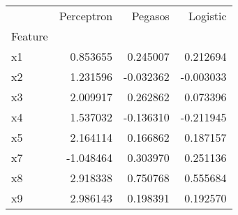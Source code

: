 \begin{tabular}{lrrr}
\toprule
 & Perceptron & Pegasos & Logistic \\
Feature &  &  &  \\
\midrule
x1 & 0.853655 & 0.245007 & 0.212694 \\
x2 & 1.231596 & -0.032362 & -0.003033 \\
x3 & 2.009917 & 0.262862 & 0.073396 \\
x4 & 1.537032 & -0.136310 & -0.211945 \\
x5 & 2.164114 & 0.166862 & 0.187157 \\
x7 & -1.048464 & 0.303970 & 0.251136 \\
x8 & 2.918338 & 0.750768 & 0.555684 \\
x9 & 2.986143 & 0.198391 & 0.192570 \\
\bottomrule
\end{tabular}
